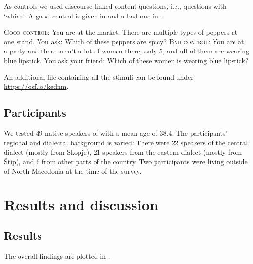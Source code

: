 \documentclass[output=paper,
colorlinks,
citecolor=brown,
newtxmath
]{langscibook}
\begin{document}
\noindent
As controls we used discourse-linked content questions, i.e., questions with `which'. A good control is given in  and a bad one in .


\eanoraggedright
\eanoraggedright \textsc{Good control:} You are at the market. There are multiple types of peppers at one stand. You ask: Which of these peppers are spicy? \label{good}
\ex \textsc{Bad control:} {You are at a party and there aren’t a lot of women there, only 5, and all of them are wearing blue lipstick. You ask your friend: Which of these women is wearing blue lipstick?} \label{bad}
\z\z

\noindent
An additional file containing all the stimuli can be found under \url{https://osf.io/kednm}.


  \subsection{Participants}\label{sec:methodp}

We tested 49 native speakers of  with a mean age of $38.4$. The participants' regional and dialectal background is varied: There were 22 speakers of the central dialect (mostly from Skopje), 21 speakers from the eastern dialect (mostly from Štip), and 6 from other parts of the country. Two participants were living outside of North Macedonia at the time of the survey.


\section{Results and discussion}\label{sec:results}

\subsection{Results}
The overall findings are plotted in .


\end{document}
